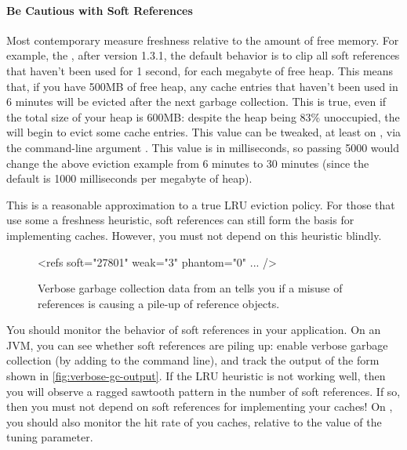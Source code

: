 \paragraph{Be Cautious with Soft References}
Most contemporary \jres measure freshness relative to the amount of free memory.
For example, the \oracle \jres, after version 1.3.1, the default behavior is to clip
all soft references that haven't been used for 1 second, for each megabyte of
free heap. This means that, if you have 500MB of free heap, any cache entries
that haven't been used in 6 minutes will be evicted after the next garbage
collection. This is true, even if the total size of your heap is 600MB: despite
the heap being 83\% unoccupied, the \jre will begin to evict some cache entries.
This value can be tweaked, at least on \oracle \jres, via the command-line argument
. This value is in milliseconds, so passing
5000 would change the above eviction example from 6 minutes to 30 minutes (since
the default is 1000 milliseconds per megabyte of heap).

This is a reasonable approximation to a true LRU eviction policy. For those
\jres that use some a freshness heuristic, soft references can still form the
basis for implementing caches. However, you must not depend on this heuristic
blindly.





\begin{wrapfigure}[7]{l}{0.395\textwidth}
\centering
\begin{framedlisting}
<refs soft="27801" weak="3" phantom="0" ... />
\end{framedlisting}
\caption{Verbose garbage collection data from an \ibm \jre tells you
if a misuse of references is causing a pile-up of reference objects.}
\label{fig:verbose-gc-output}
\end{wrapfigure}
You should monitor the behavior of soft references in your application. On an
\ibm JVM, you can see whether soft references are piling up: enable verbose
garbage collection (by adding  to the command
line), and track the output of the form shown
in \autoref{fig:verbose-gc-output}. If the LRU heuristic is not working well,
then you will observe a ragged sawtooth pattern in the number of soft
references. If so, then you must not depend on soft references for implementing
your caches! On \oracle \jres, you should also monitor the hit rate of you caches,
relative to the value of the  tuning
parameter.

